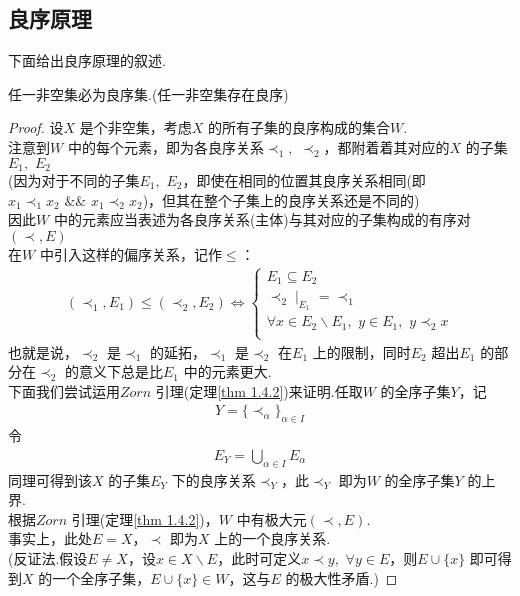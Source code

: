 \subsection{良序原理}
	下面给出良序原理的叙述.
	\begin{thm}\label{thm 1.5.1}
		任一非空集必为良序集.(任一非空集存在良序)
	\end{thm}
	\begin{proof}
		设$X$ 是个非空集，考虑$X$ 的所有子集的良序构成的集合$W$.\\
		注意到$W$ 中的每个元素，即为各良序关系$\prec_1 , \,\, \prec_2$，都附着着其对应的$X$ 的子集$E_1 , \,\, E_2$\\
		(因为对于不同的子集$E_1 , \,\, E_2$，即使在相同的位置其良序关系相同(即$x_1 \prec_1 x_2 \,\, \&\& \,\, x_1 \prec_2 x_2$)，但其在整个子集上的良序关系还是不同的)\\
		因此$W$ 中的元素应当表述为各良序关系(主体)与其对应的子集构成的有序对$(\prec , E)$\\
		在$W$ 中引入这样的偏序关系，记作$\leq$：
		\begin{align}
			(\prec_1 , E_1) \leq (\prec_2 , E_2) \Leftrightarrow 
			\begin{cases}
				E_1\subseteq E_2\\
				\prec_2\mid_{E_1}^{}=\prec_1\\
				\forall x\in E_2 \backslash E_1, \,\, y\in E_1, \,\, y \prec_2 x\\
			\end{cases}
		\end{align}
		也就是说，$\prec_2$ 是$\prec_1$ 的延拓，$\prec_1$ 是$\prec_2$ 在$E_1$ 上的限制，同时$E_2$ 超出$E_1$ 的部分在$\prec_2$ 的意义下总是比$E_1$ 中的元素更大.\\
		下面我们尝试运用$Zorn$ 引理(定理\ref{thm 1.4.2})来证明.任取$W$ 的全序子集$Y$，记
		\begin{align}
			Y = \{ \prec_{\alpha} \}_{\alpha \in I}
		\end{align}
		令
		\begin{align}
			E_Y = \bigcup_{\alpha \in I}{E_\alpha}
		\end{align}
		同理可得到该$X$ 的子集$E_Y$ 下的良序关系$\prec_Y$，此$\prec_Y$ 即为$W$ 的全序子集$Y$ 的上界.\\
		根据$Zorn$ 引理(定理\ref{thm 1.4.2})，$W$ 中有极大元$(\prec , E)$.\\
		事实上，此处$E = X$，$\prec$ 即为$X$ 上的一个良序关系.\\
		(反证法.假设$E \neq X$，设$x \in X \backslash E$，此时可定义$x \prec y , \,\, \forall y \in E$，则$E \cup \{ x \}$ 即可得到$X$ 的一个全序子集，$E \cup \{ x \} \in W$，这与$E$ 的极大性矛盾.)
	\end{proof}

